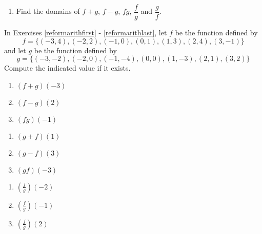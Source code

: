 \documentclass{ximera}
\begin{document}
\begin{enumerate}
\setcounter{enumi}{\value{HW}}

\item Find the domains of $f+g$, $f-g$,  $fg$, $\dfrac{f}{g}$ and $\dfrac{g}{f}$.  \label{arithfromgraphlast}

\setcounter{HW}{\value{enumi}}
\end{enumerate}

In Exercises \ref{reformarithfirst} - \ref{reformarithlast}, let $f$ be the function defined by \[f = \{(-3, 4), (-2, 2), (-1, 0), (0, 1), (1, 3), (2, 4), (3, -1)\}\] and let $g$ be the function defined by \[g = \{(-3, -2), (-2, 0), (-1, -4), (0, 0), (1, -3), (2, 1), (3, 2)\}\] Compute the indicated value if it exists.


\begin{enumerate}
\setcounter{enumi}{\value{HW}}

\item $(f + g)(-3)$ \label{reformarithfirst}
\item $(f - g)(2)$
\item $(fg)(-1)$

\setcounter{HW}{\value{enumi}}
\end{enumerate}

\begin{enumerate}
\setcounter{enumi}{\value{HW}}

\item $(g + f)(1)$
\item $(g - f)(3)$
\item $(gf)(-3)$

\setcounter{HW}{\value{enumi}}
\end{enumerate}

\begin{enumerate}
\setcounter{enumi}{\value{HW}}

\item $\left(\frac{f}{g}\right)(-2)$
\item $\left(\frac{f}{g}\right)(-1)$
\item $\left(\frac{f}{g}\right)(2)$

\setcounter{HW}{\value{enumi}}
\end{enumerate}
\end{document}
